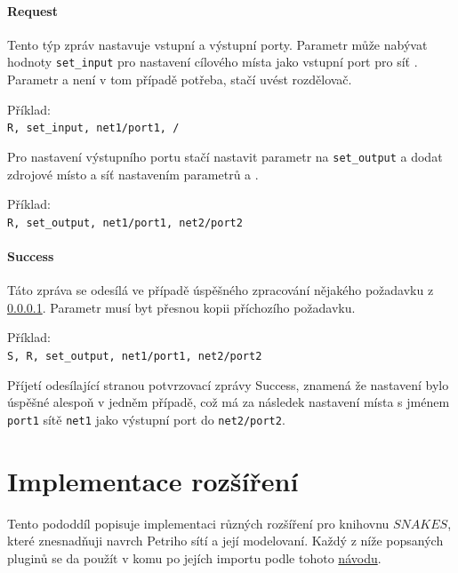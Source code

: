 \paragraph{Request} \label{par:request} Tento týp zpráv nastavuje vstupní a výstupní porty. Parametr  může nabývat hodnoty \texttt{set\_input} pro nastavení cílového místa  jako vstupní port pro síť . Parametr  a  není v tom případě potřeba, stačí uvést rozdělovač.

\begin{tabbing}
  Příklad: \= \\
  \>\texttt{R, set\_input, net1/port1, /}
\end{tabbing}

Pro nastavení výstupního portu stačí nastavit parametr  na \texttt{set\_output} a dodat zdrojové místo a síť nastavením parametrů  a .

\begin{tabbing}
  Příklad: \= \\
  \> \texttt{R, set\_output, net1/port1, net2/port2} \\
\end{tabbing}

\paragraph{Success} Táto zpráva se odesílá ve případě úspěšného zpracování nějakého požadavku z \ref{par:request}. Parametr  musí byt přesnou kopii příchozího požadavku.

\begin{tabbing}
  Příklad: \= \\
  \> \texttt{S, R, set\_output, net1/port1, net2/port2} \\
\end{tabbing}

Příjetí odesílající stranou potvrzovací zprávy Success, znamená že nastavení bylo úspěšné alespoň v jedněm případě, což má za následek nastavení místa s jménem \texttt{port1} sítě \texttt{net1} jako výstupní port do \texttt{net2/port2}.

\section{Implementace rozšíření}
\label{sec:plug-impl}
Tento pododdíl popisuje implementaci různých rozšíření pro knihovnu $SNAKES$, které znesnadňuji navrch Petriho sítí a její modelovaní. Každý z níže popsaných pluginů se da  použít v komu po jejích importu podle tohoto \href{https://www.ibisc.univ-evry.fr/~fpommereau/SNAKES/first-steps-with-snakes.html}{návodu}.

